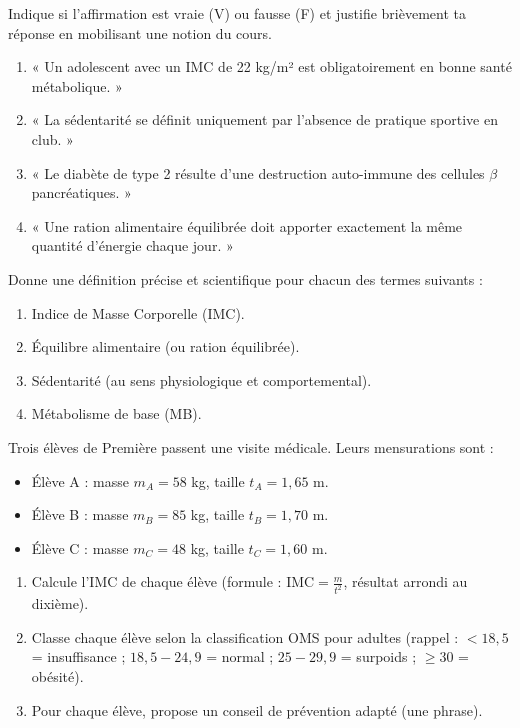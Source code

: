 \documentclass[11pt]{article}
\begin{document}
\begin{exercice}
Indique si l'affirmation est vraie (V) ou fausse (F) et justifie brièvement ta réponse en mobilisant une notion du cours.
\begin{enumerate}
\item « Un adolescent avec un IMC de 22 kg/m² est obligatoirement en bonne santé métabolique. »
\item « La sédentarité se définit uniquement par l'absence de pratique sportive en club. »
\item « Le diabète de type 2 résulte d'une destruction auto-immune des cellules $\beta$ pancréatiques. »
\item « Une ration alimentaire équilibrée doit apporter exactement la même quantité d'énergie chaque jour. »
\end{enumerate}
\end{exercice}

\begin{exercice}
Donne une définition précise et scientifique pour chacun des termes suivants :
\begin{enumerate}
\item Indice de Masse Corporelle (IMC).
\item Équilibre alimentaire (ou ration équilibrée).
\item Sédentarité (au sens physiologique et comportemental).
\item Métabolisme de base (MB).
\end{enumerate}
\end{exercice}

\begin{exercice}
Trois élèves de Première passent une visite médicale. Leurs mensurations sont :
\begin{itemize}
\item Élève A : masse $m_A = 58$ kg, taille $t_A = 1,65$ m.
\item Élève B : masse $m_B = 85$ kg, taille $t_B = 1,70$ m.
\item Élève C : masse $m_C = 48$ kg, taille $t_C = 1,60$ m.
\end{itemize}
\begin{enumerate}
\item Calcule l'IMC de chaque élève (formule : $\text{IMC} = \frac{m}{t^2}$, résultat arrondi au dixième).
\item Classe chaque élève selon la classification OMS pour adultes (rappel : $<18,5$ = insuffisance ; $18,5-24,9$ = normal ; $25-29,9$ = surpoids ; $\ge 30$ = obésité).
\item Pour chaque élève, propose un conseil de prévention adapté (une phrase).
\end{enumerate}
\end{exercice}
\end{document}
